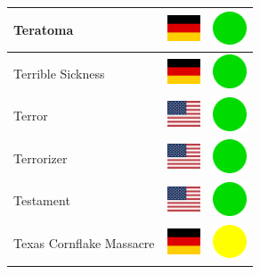 \documentclass[12pt, a4paper, twoside]{report}
\begin{document}
\begin{center}
\begin{longtable}{|p{5cm}|p{2cm}|p{2cm}|}
 Teratoma                                                   & \includegraphics[width=1cm]{../img/flags/de} &   \includegraphics[width=1cm]{../likes/y} \\ \hline
 Terrible Sickness                                          & \includegraphics[width=1cm]{../img/flags/de} &   \includegraphics[width=1cm]{../likes/y} \\ \hline
 Terror                                                     & \includegraphics[width=1cm]{../img/flags/us} &   \includegraphics[width=1cm]{../likes/y} \\ \hline
 Terrorizer                                                 & \includegraphics[width=1cm]{../img/flags/us} &   \includegraphics[width=1cm]{../likes/y} \\ \hline
 Testament                                                  & \includegraphics[width=1cm]{../img/flags/us} &   \includegraphics[width=1cm]{../likes/y} \\ \hline
 Texas Cornflake Massacre                                   & \includegraphics[width=1cm]{../img/flags/de} &   \includegraphics[width=1cm]{../likes/m} \\ \hline

\end{longtable}
\end{center}
\end{document}
